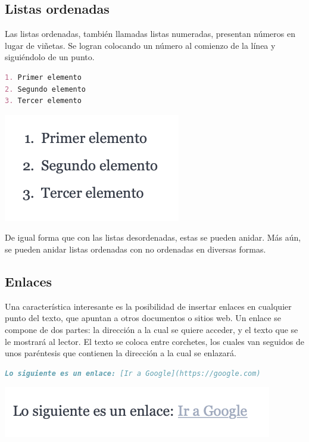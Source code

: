 \subsection*{Listas ordenadas}

Las listas ordenadas, también llamadas listas numeradas, presentan números
en lugar de viñetas. Se logran colocando un número al comienzo de la línea
y siguiéndolo de un punto.

\begin{lstlisting}[language=Markdown]
1. Primer elemento
2. Segundo elemento
3. Tercer elemento
\end{lstlisting}

\includegraphics[]{anexos/1_lenguajes_marcado/1_markdown/imagenes/md_olist.png}

De igual forma que con las listas desordenadas, estas se pueden anidar. Más
aún, se pueden anidar listas ordenadas con no ordenadas en diversas formas.

\subsection*{Enlaces}

Una característica interesante es la posibilidad de insertar enlaces en cualquier
punto del texto, que apuntan a otros documentos o sitios web. Un enlace se compone
de dos partes: la dirección a la cual se quiere acceder, y el texto que se le
mostrará al lector. El texto se coloca entre corchetes, los cuales van seguidos
de unos paréntesis que contienen la dirección a la cual se enlazará.

\begin{lstlisting}[language=Markdown]
Lo siguiente es un enlace: [Ir a Google](https://google.com)
\end{lstlisting}

\includegraphics[]{anexos/1_lenguajes_marcado/1_markdown/imagenes/md_enlace.png}

